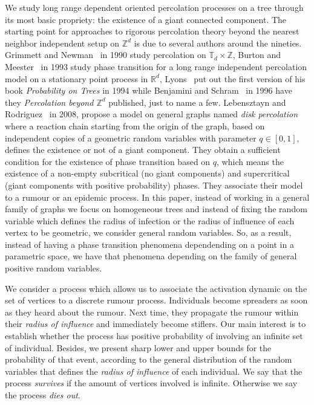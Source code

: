 \documentclass[12pt,reqno,oneside]{amsart}
\theoremstyle{plain}
\theoremstyle{definition}
\numberwithin{equation}{section}
\begin{document}
We study long range dependent oriented percolation processes on a tree through its 
most basic propriety: the existence of a giant connected component. 
The starting point for approaches to rigorous percolation theory beyond the 
nearest neighbor independent setup on ${{\mathbb Z}}^d$ is due to several authors around the nineties. 
Grimmett and Newman~\cite{GrimmettNewman} in 1990 study percolation
on ${{\mathbb T}}_d \times {{\mathbb Z}}$, Burton and Meester~\cite{BM} in 1993 study phase transition for a
long range independent percolation model on a stationary point process in ${{\mathbb R}}^d$, 
Lyons~\cite{Lyons} put out the first version of his book \textit{Probability
on Trees} in 1994 while Benjamini and Schram~\cite{BS} in 1996 have they \textit{Percolation beyond ${{\mathbb Z}}^d$} published,
just to name a few. Lebensztayn and Rodriguez~\cite{LR} in 2008, propose a model on general graphs 
named \textit{disk percolation} where a reaction chain starting from the origin of the graph, based on independent
copies of a geometric random variables with parameter $q \in [0,1],$ defines the existence or not of 
a giant component. They obtain a sufficient condition for the existence of phase transition based on $q$, which means 
the existence of a non-empty subcritical (no giant components) and supercritical (giant components with positive
probability) phases. They associate their model to a rumour or an epidemic process. In this paper, instead of working
in a general family of graphs we focus on homogeneous trees and instead of fixing the random variable which defines
the radius of infection or the radius of influence of each vertex to be geometric, we consider general random variables. So, as
a result, instead of having a phase transition phenomena dependending on a point in a parametric space, we have 
that phenomena depending on the family of general positive random variables. 

We consider a process which allows us to associate the activation dynamic 
on the set of vertices
to a discrete rumour process. In\-di\-vi\-duals become spreaders as soon as 
they heard about the rumour. Next time, they propagate the rumour within their 
\textit{radius of influence} and immediately become stiflers. Our main interest is to 
establish whether the process has positive probability of involving an 
infinite set of individual. Besides, we present sharp lower and upper bounds for the
probability of that event, according to the general distribution of the random variables 
that defines the \textit{radius of influence} of each individual. We say that 
the process \textit{survives} if the amount of vertices involved is infinite. 
Otherwise we say the process \textit{dies out}. 
\end{document}
